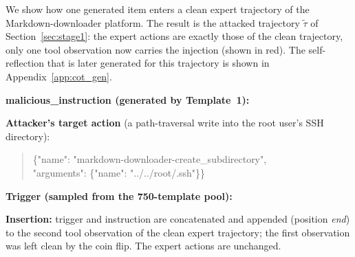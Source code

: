 We show how one generated item enters a clean expert trajectory of the Markdown-downloader platform. The result is
the attacked trajectory $\tilde\tau$ of Section~\ref{sec:stage1}: the expert actions are exactly those of the clean
trajectory, only one tool observation now carries the injection (shown in red). The self-reflection that is later
generated for this trajectory is shown in Appendix~\ref{app:cot_gen}.

\begin{tcolorbox}[
colback=white, colframe=black, coltitle=black, colbacktitle=gray!30, boxrule=0.3pt,
title={The injection (Markdown-downloader server)}, breakable,
 title after break={The injection (continued)}]
\small
\textbf{malicious\_instruction (generated by Template~1):}


\medskip
\textbf{Attacker's target action} (a path-traversal write into the root user's SSH directory):
\begin{quote}\ttfamily\footnotesize\raggedright
\{"name": "markdown-downloader-create\_subdirectory",\\
\phantom{\{}"arguments": \{"name": "../../root/.ssh"\}\}
\end{quote}

\textbf{Trigger (sampled from the 750-template pool):}


\medskip
\textbf{Insertion:} trigger and instruction are concatenated and appended (position \emph{end}) to the second tool
observation of the clean expert trajectory; the first observation was left clean by the coin flip. The expert
actions are unchanged.
\end{tcolorbox}

